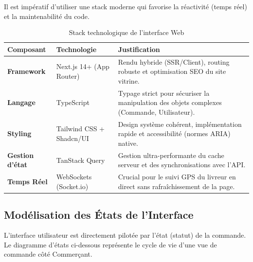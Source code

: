Il est impératif d'utiliser une stack moderne qui favorise la réactivité (temps réel) et la maintenabilité du code.

\begin{table}[ht!]
    \centering
    \renewcommand{\arraystretch}{1.3}
    \begin{tabularx}{\textwidth}{@{} l l X @{}}
        \toprule
        \textbf{Composant} & \textbf{Technologie} & \textbf{Justification} \\
        \midrule
        \textbf{Framework} & Next.js 14+ (App Router) & Rendu hybride (SSR/Client), routing robuste et optimisation SEO du site vitrine. \\
        \textbf{Langage} & TypeScript & Typage strict pour sécuriser la manipulation des objets complexes (Commande, Utilisateur). \\
        \textbf{Styling} & Tailwind CSS + Shadcn/UI & Design système cohérent, implémentation rapide et accessibilité (normes ARIA) native. \\
        \textbf{Gestion d'état} & TanStack Query & Gestion ultra-performante du cache serveur et des synchronisations avec l'API. \\
        \textbf{Temps Réel} & WebSockets (Socket.io) & Crucial pour le suivi GPS du livreur en direct sans rafraîchissement de la page. \\
        \bottomrule
    \end{tabularx}
    \caption{Stack technologique de l'interface Web}
    \label{tab:tech_stack}
\end{table}

\subsection{Modélisation des États de l'Interface}

L'interface utilisateur est directement pilotée par l'état (statut) de la commande. Le diagramme d'états ci-dessous représente le cycle de vie d'une vue de commande côté Commerçant.

